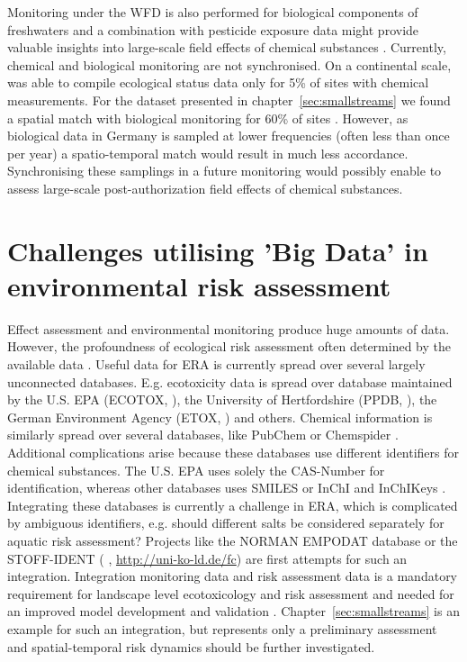 Monitoring under the WFD is also performed for biological components of freshwaters and a combination with pesticide exposure data might provide valuable insights into large-scale field effects of chemical substances \citep{schipper_deriving_2014}.
Currently, chemical and biological monitoring are not synchronised.
On a continental scale, \citet{malaj_organic_2014} was able to compile ecological status data only for 5\% of sites with chemical measurements.
For the dataset presented in chapter~\ref{sec:smallstreams} we found a spatial match with biological monitoring for 60\% of sites \citep{brinke_umsetzung_2016}.
However, as biological data in Germany is sampled at lower frequencies (often less than once per year) a spatio-temporal match would result in much less accordance. 
Synchronising these samplings in a future monitoring would possibly enable to assess large-scale post-authorization field effects of chemical substances.



\section{Challenges utilising 'Big Data' in environmental risk assessment}

Effect assessment and environmental monitoring produce huge amounts of data. 
However, the profoundness of ecological risk assessment often determined by the available data \citep{van_den_brink_new_2016}.
Useful data for ERA is currently spread over several largely unconnected databases. 
E.g. ecotoxicity data is spread over database maintained by the U.S. EPA (ECOTOX, \citet{u.s._epa_ecotox_2016}), the University of Hertfordshire (PPDB, \citet{lewis_international_2016}), the German Environment Agency (ETOX, \citet{umweltbundesamt_etox:_2016}) and others. 
Chemical information is similarly spread over several databases, like PubChem \citep{kim_pubchem_2016} or Chemspider \citep{pence_chemspider:_2010}.
Additional complications arise because these databases use different identifiers for chemical substances. 
The U.S. EPA \citep{u.s._epa_ecotox_2016} uses solely the CAS-Number for identification, whereas other databases uses SMILES \citep{weininger_smiles._1990} or InChI and InChIKeys \citep{heller_inchi_2015}. 
Integrating these databases is currently a challenge in ERA, which is complicated by ambiguous identifiers, e.g. should different salts be considered separately for aquatic risk assessment?
Projects like the NORMAN EMPODAT database \citep{brack_norman_2012} or the STOFF-IDENT (\citeauthor{huckele_risk_2013} \cite*{huckele_risk_2013}, \url{http://uni-ko-ld.de/fc}) are first attempts for such an integration.
Integration monitoring data and risk assessment data is a mandatory requirement for landscape level ecotoxicology and risk assessment \citep{focks_challenge:_2014} and needed for an improved model development and validation \citep{knabel_regulatory_2012, brock_aquatic_2006}. 
Chapter~\ref{sec:smallstreams} is an example for such an integration, but represents only a preliminary assessment and spatial-temporal risk dynamics should be further investigated. 

